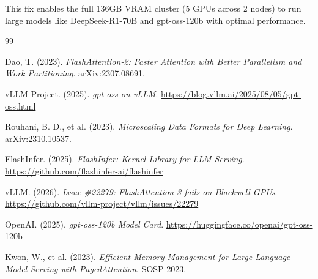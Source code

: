 \documentclass[10pt,letterpaper]{article}
\begin{document}
This fix enables the full 136GB VRAM cluster (5 GPUs across 2 nodes) to run large models like DeepSeek-R1-70B and gpt-oss-120b \cite{gptoss-hf} with optimal performance.

\begin{thebibliography}{99}

Dao, T. (2023). \textit{FlashAttention-2: Faster Attention with Better Parallelism and Work Partitioning}. arXiv:2307.08691.

vLLM Project. (2025). \textit{gpt-oss on vLLM}. \url{https://blog.vllm.ai/2025/08/05/gpt-oss.html}

Rouhani, B. D., et al. (2023). \textit{Microscaling Data Formats for Deep Learning}. arXiv:2310.10537.

FlashInfer. (2025). \textit{FlashInfer: Kernel Library for LLM Serving}. \url{https://github.com/flashinfer-ai/flashinfer}

vLLM. (2026). \textit{Issue \#22279: FlashAttention 3 fails on Blackwell GPUs}. \url{https://github.com/vllm-project/vllm/issues/22279}

OpenAI. (2025). \textit{gpt-oss-120b Model Card}. \url{https://huggingface.co/openai/gpt-oss-120b}

Kwon, W., et al. (2023). \textit{Efficient Memory Management for Large Language Model Serving with PagedAttention}. SOSP 2023.

\end{thebibliography}
\end{document}

